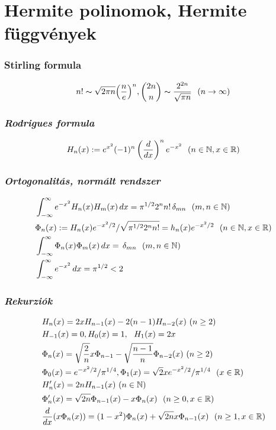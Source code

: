 \documentclass[oneside,titlepage,12pt,a4paper]{report}
\begin{document}
\section {Hermite  polinomok, Hermite függvények}
\subsubsection{Stirling  formula}
\begin{equation*}
n!\thicksim \sqrt {2\pi n}\Big(\frac ne\Big)^n,  \binom {2n} n\thicksim \frac {2^{2n}}{\sqrt{\pi n}}\ \ (
n\to\infty)
\end{equation*}

\subsubsection{\it  Rodrigues formula}
\begin{equation}
\begin{split}
&H_n(x):=e^{x^2}(-1)^n\left(\frac d{dx}\right)^n e^{-x^2}\ \ (n\in\Bbb N, x\in\Bbb R)\\
\end{split}
\end{equation}

\subsubsection{\it  Ortogonalitás, normált rendszer}
\begin{equation}
\begin{split}
&\int_{-\infty}^\infty e^{-x^2}H_n(x)H_m(x)\, dx=\pi^{1/2}2^n n!\, \delta_{mn}\ \ (m,n\in\Bbb N)\\
&\Phi_n(x):=H_n(x)e^{-x^2/2}/\sqrt{\pi^{1/2}2^n n!}=h_n(x)e^{-x^2/2} \ \ (n\in\Bbb N, x\in\Bbb R)\\
&\int_{-\infty}^\infty \Phi_n(x)\Phi_m(x)\, dx=\, \delta_{mn}\ \ (m,n\in\Bbb N)\\
&\int_{-\infty}^\infty e^{-x^2}\, dx=\pi^{1/2}<2
\end{split}
\end{equation}

\subsubsection{\it  Rekurziók}
\begin{equation}
\begin{split}
&H_n(x)=2xH_{n-1}(x)-2(n-1)H_{n-2}(x)\ (n\ge 2)\\
&H_{-1}(x)=0,  H_0(x)=1,\ \ H_1(x)=2x\\
&\Phi_n(x)=\sqrt{\frac 2 n}x\Phi_{n-1}-\sqrt{\frac {n-1} n}\Phi_{n-2}(x)\ (n\ge 2)\\ &\Phi_0(x)=e^{-x^2/2}/\pi^{1/4}, \Phi_1(x)= \sqrt 2 x e^{-x^2/2}/\pi^{1/4}\ \ (x\in\Bbb R)\\
&H'_n(x)=2nH_{n-1}(x)\ (n\in\Bbb N)\\
&\Phi'_n(x)=\sqrt{2n}\Phi_{n-1}(x)-x\Phi_n(x)\ \ (n\ge 0, x\in\Bbb R)\\
&\frac d{dx}(x\Phi_n(x))=(1-x^2)\Phi_n(x)+\sqrt{2n}x\Phi_{n-1}(x)\ \ (n\ge 1, x\in\Bbb R)
\label{eq:identities}
\end{split}
\end{equation}
\end{document}
